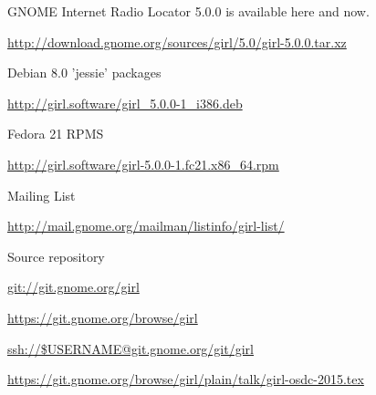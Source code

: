 \documentclass[20pt,landscape]{foils}
\begin{document}
\begin{list1}
\item GNOME Internet Radio Locator 5.0.0 is available here and now.
  \begin{list2}
  \item \url{http://download.gnome.org/sources/girl/5.0/girl-5.0.0.tar.xz}
  \end{list2}
\item Debian 8.0 'jessie' packages
  \begin{list2}
  \item \url{http://girl.software/girl_5.0.0-1_i386.deb}
  \end{list2}
\item Fedora 21 RPMS
  \begin{list2}
  \item \url{http://girl.software/girl-5.0.0-1.fc21.x86_64.rpm}
  \end{list2}
\item Mailing List    
  \begin{list2}
  \item \url{http://mail.gnome.org/mailman/listinfo/girl-list/}
  \end{list2}
\item Source repository
  \begin{list2}
    \item \url{git://git.gnome.org/girl}
    \item \url{https://git.gnome.org/browse/girl}
    \item \url{ssh://$USERNAME@git.gnome.org/git/girl}
  \end{list2}
\end{list1}


\url{https://git.gnome.org/browse/girl/plain/talk/girl-osdc-2015.tex}
\end{document}
